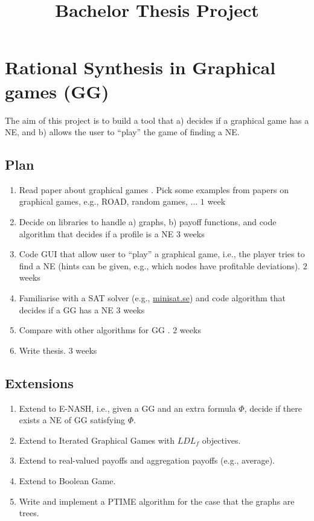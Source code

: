 \documentclass[a4paper,10pt]{article}
\title{Bachelor Thesis Project}
\author{}
\date{}
\begin{document}
\maketitle

\section*{Rational Synthesis in Graphical games (GG)}

The aim of this project is to build a tool that a) decides if a graphical game has a NE, and b) allows the user to ``play'' the game of finding a NE.


\subsection*{Plan}
\begin{enumerate}
 \item Read paper about graphical games \cite{DBLP:conf/aaai/VickreyK02}. Pick some examples from papers on graphical games, e.g., ROAD, random games, ... \hfill $1$ week
 \item Decide on libraries to handle a) graphs, b) payoff functions, and code algorithm that decides if a profile is a NE \hfill $3$ weeks %
 \item Code GUI that allow user to ``play'' a graphical game, i.e., the player tries to find a NE (hints can be given, e.g., 
 which nodes have profitable deviations). \hfill $2$ weeks
 \item Familiarise with a SAT solver (e.g., \url{minisat.se}) and code algorithm that decides if a GG has a NE \hfill $3$ weeks
 \item Compare with other algorithms for GG \cite{DBLP:journals/aamas/ClercqBSMNC17}. \hfill $2$ weeks
 \item Write thesis. \hfill $3$ weeks
\end{enumerate}

\subsection*{Extensions}
\begin{enumerate}
 \item Extend to E-NASH, i.e., given a GG and an extra formula $\Phi$, decide if there exists a NE of GG satisfying $\Phi$.
 \item Extend to Iterated Graphical Games with $LDL_f$ objectives.
 \item Extend to real-valued payoffs and aggregation payoffs (e.g., average).
 \item Extend to Boolean Game.
 \item Write and implement a PTIME algorithm for the case that the graphs are trees.
\end{enumerate}
\end{document}
